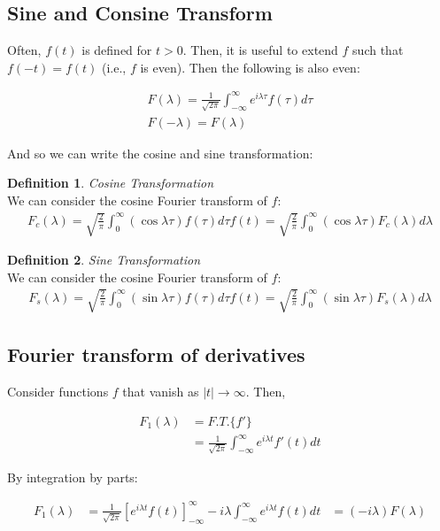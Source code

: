\documentclass{article}
\theoremstyle{definition}
\newtheorem{definition}{Definition}[section]
\newcommand{\Def}[2]{
\begin{shaded*}
\begin{definition}{\textit{#1}}\\#2\end{definition}
\end{shaded*}
}
\begin{document}
\subsection{Sine and Consine Transform}

Often, $f(t)$ is defined for $t>0$. Then, it is useful to extend $f$ such that $f(-t) = f(t)$ (i.e., $f$ is even). Then the following is also even:

\begin{align*}
F(\lambda) = \frac{1}{\sqrt{2\pi}}\int_{-\infty}^{\infty}  e^{i\lambda \tau} f(\tau) d\tau\\
F(-\lambda) = F(\lambda)
\end{align*}

And so we can write the cosine and sine transformation:
\Def{Cosine Transformation}{
	
We can consider the cosine Fourier transform of $f$:
\begin{align*}
F_c(\lambda) = \sqrt{\frac{2}{\pi}} \int_{0}^{\infty} (\cos \lambda \tau ) f(\tau) d\tau
f(t) = \sqrt{\frac{2}{\pi}} \int_{0}^{\infty} (\cos \lambda \tau ) F_c(\lambda) d\lambda
\end{align*}
}

\Def{Sine Transformation}{
	
	We can consider the cosine Fourier transform of $f$:
	\begin{align*}
	F_s(\lambda) = \sqrt{\frac{2}{\pi}} \int_{0}^{\infty} (\sin \lambda \tau ) f(\tau) d\tau
	f(t) = \sqrt{\frac{2}{\pi}} \int_{0}^{\infty} (\sin \lambda \tau ) F_s(\lambda) d\lambda
	\end{align*}
}

\subsection{Fourier transform of derivatives}

Consider functions $f$ that vanish as $|t| \to \infty$. Then, 

\begin{align*}
F_1(\lambda) &= F.T. \{f'\}\\
& = \frac{1}{\sqrt{2 \pi}} \int_{-\infty}^{\infty}  e^{i\lambda t} f'(t) dt
\end{align*}

By integration by parts:

\begin{align*}
F_1(\lambda) & = \frac{1}{\sqrt{2 \pi}} \left[e^{i\lambda t} f(t) \right]_{-\infty }^\infty - i \lambda \int_{-\infty}^{\infty}  e^{i\lambda t} f(t) dt
&= (-i\lambda) F(\lambda)
\end{align*}
\end{document}
